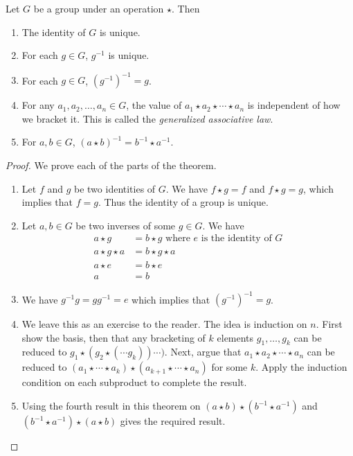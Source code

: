 \begin{theorem}
Let $G$ be a group under an operation $\star$. Then
\begin{enumerate}
    \item The identity of $G$ is unique.
    \item For each $g\in G$, $g^{-1}$ is unique.
    \item For each $g\in G$, $(g^{-1})^{-1}=g$.
    \item For any $a_1,a_2,\ldots,a_n\in G$, the value of $a_1\star a_2\star\cdots\star a_n$ is independent of how we bracket it. This is called the \textit{generalized associative law}.
    \item For $a,b\in G$, $(a\star b)^{-1}=b^{-1}\star a^{-1}$.
\end{enumerate}
\end{theorem}
\begin{proof}
We prove each of the parts of the theorem.
\begin{enumerate}
    \item Let $f$ and $g$ be two identities of $G$. We have $f\star g=f$ and $f\star g=g$, which implies that $f=g$. Thus the identity of a group is unique.
    \item Let $a,b\in G$ be two inverses of some $g\in G$. We have
    \begin{align*}
        a\star g &= b\star g\text{ where $e$ is the identity of $G$} \\
        a\star g\star a &= b\star g\star a \\
        a\star e &= b\star e \\
        a &= b
    \end{align*}
    \item We have $g^{-1}g=gg^{-1}=e$ which implies that $(g^{-1})^{-1}=g$.
    \item We leave this as an exercise to the reader. The idea is induction on $n$. First show the basis, then that any bracketing of $k$ elements $g_1,\ldots,g_k$ can be reduced to $g_1\star (g_2\star(\cdots g_k))\cdots)$. Next, argue that $a_1\star a_2\star \cdots\star a_n$ can be reduced to $(a_1\star\cdots\star a_k)\star(a_{k+1}\star\cdots\star a_n)$ for some $k$. Apply the induction condition on each subproduct to complete the result.
    \item Using the fourth result in this theorem on $(a\star b)\star(b^{-1}\star a^{-1})$ and $(b^{-1}\star a^{-1})\star (a\star b)$ gives the required result.
\end{enumerate}
\end{proof}

